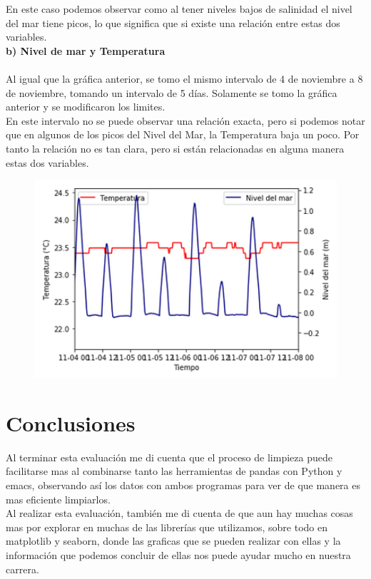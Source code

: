 \documentclass[12pt]{article}
\begin{document}
En este caso podemos observar como al tener niveles bajos de salinidad el nivel del mar tiene picos, lo que significa que si existe una relación entre estas dos variables. \\

\noindent\textbf {b) Nivel de mar y Temperatura} \\ \\
Al igual que la gráfica anterior, se tomo el mismo intervalo de 4 de noviembre a 8 de noviembre, tomando un intervalo de 5 días. Solamente se tomo la gráfica anterior y se modificaron los limites. \\

En este intervalo no se puede observar una relación exacta, pero si podemos notar que en algunos de los picos del Nivel del Mar, la Temperatura baja un poco. Por tanto la relación no es tan clara, pero si están relacionadas en alguna manera estas dos variables. 

\begin{figure}[h!]
    \centering
\includegraphics[width=5in]{SP2lim.png}
\end{figure}
\vfill

\section{Conclusiones}
Al terminar esta evaluación me di cuenta que el proceso de limpieza puede facilitarse mas al combinarse tanto las herramientas de pandas con Python y emacs, observando así los datos con ambos programas para ver de que manera es mas eficiente limpiarlos. \\

Al realizar esta evaluación, también me di cuenta de que aun hay muchas cosas mas por explorar en muchas de las librerías que utilizamos, sobre todo en matplotlib y seaborn, donde las graficas que se pueden realizar con ellas y la información que podemos concluir de ellas nos puede ayudar mucho en nuestra carrera. \\
\end{document}
